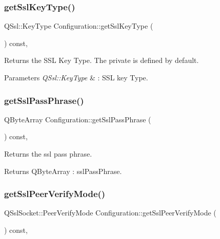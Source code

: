 \subsubsection{\texorpdfstring{get\+Ssl\+Key\+Type()}{getSslKeyType()}}
{\footnotesize\ttfamily Q\+Ssl\+::\+Key\+Type Configuration\+::get\+Ssl\+Key\+Type (\begin{DoxyParamCaption}{ }\end{DoxyParamCaption}) const\hspace{0.3cm}{\ttfamily [inline]}, {\ttfamily [noexcept]}}



Returns the S\+SL Key Type. The private is defined by default. 


\begin{DoxyParams}{Parameters}
{\em Q\+Ssl\+::\+Key\+Type} & \+: S\+SL key Type. \\
\hline
\end{DoxyParams}
\mbox{\label{class_configuration_ae5e1bc207332b2f089f2168ada606c48}} 
\subsubsection{\texorpdfstring{get\+Ssl\+Pass\+Phrase()}{getSslPassPhrase()}}
{\footnotesize\ttfamily Q\+Byte\+Array Configuration\+::get\+Ssl\+Pass\+Phrase (\begin{DoxyParamCaption}{ }\end{DoxyParamCaption}) const\hspace{0.3cm}{\ttfamily [inline]}, {\ttfamily [noexcept]}}



Returns the ssl pass phrase. 

\begin{DoxyReturn}{Returns}
Q\+Byte\+Array \+: ssl\+Pass\+Phrase. 
\end{DoxyReturn}
\mbox{\label{class_configuration_ae7e5872717b012e16dc2255d1741e422}} 
\subsubsection{\texorpdfstring{get\+Ssl\+Peer\+Verify\+Mode()}{getSslPeerVerifyMode()}}
{\footnotesize\ttfamily Q\+Ssl\+Socket\+::\+Peer\+Verify\+Mode Configuration\+::get\+Ssl\+Peer\+Verify\+Mode (\begin{DoxyParamCaption}{ }\end{DoxyParamCaption}) const\hspace{0.3cm}{\ttfamily [inline]}, {\ttfamily [noexcept]}}



